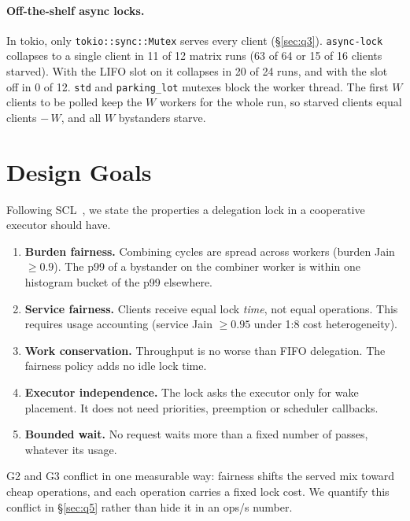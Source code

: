 \documentclass[10pt,twocolumn]{article}
\newcommand{\lk}[1]{\texttt{#1}}
\begin{document}
\begin{table}[t]
\centering\footnotesize\setlength{\tabcolsep}{3pt}
\caption{FIFO service fairness, $W{=}8$, sustained, b31 (09-28 window).
  CS$_{L,H}$ are critical-section cycles per op (TSC). The model uses
  $x=\text{L:H}\cdot\text{CS}_L/\text{CS}_H$. The last column is
  CS$_H$/CS$_L$.}
\label{tab:fifo}
\end{table}

\paragraph{Off-the-shelf async locks.}
In tokio, only \lk{tokio::sync::Mutex} serves every client (\S\ref{sec:q3}).
\lk{async-lock}~\cite{asynclock} collapses to a single client in 11 of 12
matrix runs (63 of 64 or 15 of 16 clients starved). With the LIFO slot on it
collapses in 20 of 24 runs, and with the slot off in 0 of 12. \lk{std} and
\lk{parking\_lot} mutexes block the worker thread. The first $W$ clients to be
polled keep the $W$ workers for the whole run, so starved clients equal clients
$-\,W$, and all $W$ bystanders starve.

\section{Design Goals}\label{sec:goals}

Following SCL~\cite{scl}, we state the properties a delegation lock in a
cooperative executor should have.
\begin{enumerate}[label=\textbf{G\arabic*}]
\item \textbf{Burden fairness.} Combining cycles are spread across workers
  (burden Jain $\ge0.9$). The p99 of a bystander on the combiner worker is
  within one histogram bucket of the p99 elsewhere.
\item \textbf{Service fairness.} Clients receive equal lock \emph{time}, not
  equal operations. This requires usage accounting (service Jain $\ge0.95$
  under 1:8 cost heterogeneity).
\item \textbf{Work conservation.} Throughput is no worse than FIFO
  delegation. The fairness policy adds no idle lock time.
\item \textbf{Executor independence.} The lock asks the executor only for
  wake placement. It does not need priorities, preemption or scheduler
  callbacks.
\item \textbf{Bounded wait.} No request waits more than a fixed number of
  passes, whatever its usage.
\end{enumerate}
G2 and G3 conflict in one measurable way: fairness shifts the served mix
toward cheap operations, and each operation carries a fixed lock cost. We
quantify this conflict in \S\ref{sec:q5} rather than hide it in an ops/s
number.
\end{document}
